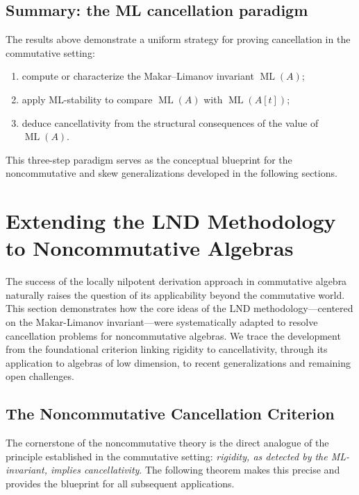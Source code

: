 \documentclass{amsart}
\theoremstyle{plain}
\numberwithin{theorem}{section}
\numberwithin{equation}{theorem}
\theoremstyle{definition}
\DeclareMathOperator{\ML}{ML}
\begin{document}
\subsection{Summary: the ML cancellation paradigm}

The results above demonstrate a uniform strategy for proving cancellation in the
commutative setting:
\begin{enumerate}
    \item compute or characterize the Makar--Limanov invariant $\ML(A)$;
    \item apply ML-stability to compare $\ML(A)$ with $\ML(A[t])$;
    \item deduce cancellativity from the structural consequences of the value of 
          $\ML(A)$.
\end{enumerate}
This three-step paradigm serves as the conceptual blueprint for the 
noncommutative and skew generalizations developed in the following sections.







\section{Extending the LND Methodology to Noncommutative Algebras}
\label{xxsec3} 

The success of the locally nilpotent derivation approach in commutative algebra naturally raises the question of its applicability beyond the commutative world. This section demonstrates how the core ideas of the LND methodology—centered on the Makar-Limanov invariant—were systematically adapted to resolve cancellation problems for noncommutative algebras. We trace the development from the foundational criterion linking rigidity to cancellativity, through its application to algebras of low dimension, to recent generalizations and remaining open challenges.

\subsection{The Noncommutative Cancellation Criterion}

The cornerstone of the noncommutative theory is the direct analogue of the principle established in the commutative setting: \emph{rigidity, as detected by the ML-invariant, implies cancellativity}. The following theorem makes this precise and provides the blueprint for all subsequent applications.
\end{document}
